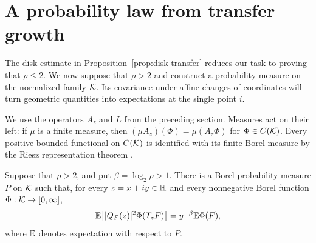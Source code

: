 \section{A probability law from transfer growth}
\label{sec:weighted-law}

The disk estimate in Proposition~\ref{prop:disk-transfer} reduces our task to
proving that $\rho\leq 2$.  We now suppose that $\rho>2$ and construct a
probability measure on the normalized family $\mathcal K$.  Its covariance under
affine changes of coordinates will turn geometric quantities into expectations
at the single point $i$.

We use the operators $A_z$ and $L$ from the preceding section.  Measures act
on their left: if $\mu$ is a finite measure, then
$(\mu A_z)(\Phi)=\mu(A_z\Phi)$ for $\Phi\in C(\mathcal K)$.  Every positive bounded
functional on $C(\mathcal K)$ is identified with its finite Borel measure by the
Riesz representation theorem \cite[Theorem~7.2]{Folland1999}.

\begin{lemma}
\label{lem:weighted-law}
Suppose that $\rho>2$, and put $\beta=\log_2\rho>1$.  There is a Borel
probability measure $P$ on $\mathcal K$ such that, for every $z=x+iy\in\mathbb H$ and
every nonnegative Borel function $\Phi:\mathcal K\to[0,\infty]$,
\begin{equation}
 \mathbb E\!\left[|Q_F(z)|^2\Phi(T_zF)\right]
   =y^{-\beta}\mathbb E\Phi(F),
 \label{eq:weighted-covariance}
\end{equation}
where $\mathbb E$ denotes expectation with respect to $P$.
\end{lemma}

